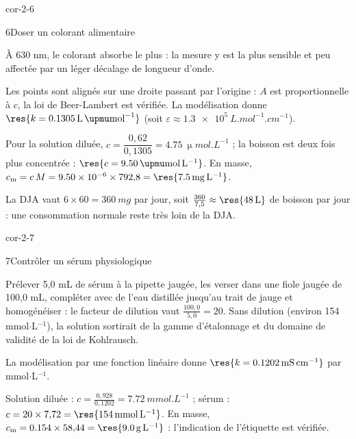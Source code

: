 \begin{blocLivre}{cor-2-6}
\begin{corrige}{6}{Doser un colorant alimentaire}
\begin{questions}
\item À 630 nm, le colorant absorbe le plus : la mesure y est la plus sensible et peu affectée par un léger
décalage de longueur d'onde.
\item Les points sont alignés sur une droite passant par l'origine : $A$ est proportionnelle à $c$, la loi de
Beer-Lambert est vérifiée. La modélisation donne $\res{k=\qty{0,1305}{L.\upmu mol^{-1}}}$
(soit $\varepsilon\approx\qty{1,3e5}{L.mol^{-1}.cm^{-1}}$).
\item Pour la solution diluée, $c=\dfrac{0{,}62}{0{,}1305}=\qty{4,75}{\upmu mol.L^{-1}}$ ; la boisson est deux fois
plus concentrée : $\res{c=\qty{9,50}{\upmu mol.L^{-1}}}$. En masse,
$c_\mathrm{m}=c\,M=\num{9.50e-6}\times792{,}8=\res{\qty{7,5}{mg.L^{-1}}}$.
\item La DJA vaut $6\times60=\qty{360}{mg}$ par jour, soit $\frac{360}{7{,}5}\approx\res{\qty{48}{L}}$ de boisson par jour :
une consommation normale reste très loin de la DJA.
\end{questions}
\end{corrige}
\end{blocLivre}
\begin{blocLivre}{cor-2-7}
\begin{corrige}{7}{Contrôler un sérum physiologique}
\begin{questions}
\item Prélever 5,0 mL de sérum à la pipette jaugée, les verser dans une fiole jaugée de 100,0 mL, compléter avec de
l'eau distillée jusqu'au trait de jauge et homogénéiser : le facteur de dilution vaut $\frac{100{,}0}{5{,}0}=20$.
Sans dilution (environ 154 mmol$\cdot$L$^{-1}$), la solution sortirait de la gamme d'étalonnage et du domaine de
validité de la loi de Kohlrausch.
\item La modélisation par une fonction linéaire donne $\res{k=\qty{0,1202}{mS.cm^{-1}}}$ par mmol$\cdot$L$^{-1}$.
\item Solution diluée : $c=\frac{0{,}928}{0{,}1202}=\qty{7,72}{mmol.L^{-1}}$ ; sérum : $c=20\times7{,}72=\res{\qty{154}{mmol.L^{-1}}}$.
En masse, $c_\mathrm{m}=\num{0.154}\times58{,}44=\res{\qty{9,0}{g.L^{-1}}}$ : l'indication de l'étiquette est vérifiée.
\end{questions}
\end{corrige}
\end{blocLivre}
